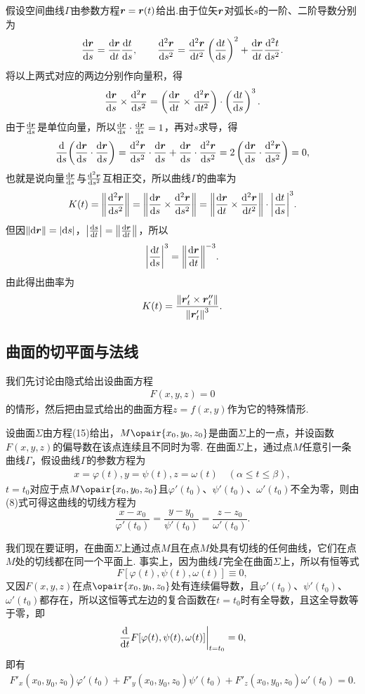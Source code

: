 假设空间曲线\(\Gamma\)由参数方程\(\boldsymbol{r} = \boldsymbol{r}(t)\)给出.由于位矢\(\boldsymbol{r}\)对弧长\(s\)的一阶、二阶导数分别为\[
\dv{\boldsymbol{r}}{s} = \dv{\boldsymbol{r}}{t} \dv{t}{s},
\qquad
\dv[2]{\boldsymbol{r}}{s} = \dv[2]{\boldsymbol{r}}{t} \left(\dv{t}{s}\right)^2 + \dv{\boldsymbol{r}}{t} \dv[2]{t}{s}.
\]将以上两式对应的两边分别作向量积，得\[
\dv{\boldsymbol{r}}{s} \times \dv[2]{\boldsymbol{r}}{s}
= \left(\dv{\boldsymbol{r}}{t} \times \dv[2]{\boldsymbol{r}}{t}\right) \cdot \left(\dv{t}{s}\right)^3.
\]由于\(\dv{\boldsymbol{r}}{s}\)是单位向量，所以\(\dv{\boldsymbol{r}}{s} \cdot \dv{\boldsymbol{r}}{s} = 1\)，再对\(s\)求导，得\[
\dv{s}( \dv{\boldsymbol{r}}{s} \cdot \dv{\boldsymbol{r}}{s} )
= \dv[2]{\boldsymbol{r}}{s} \cdot \dv{\boldsymbol{r}}{s} + \dv{\boldsymbol{r}}{s} \cdot \dv[2]{\boldsymbol{r}}{s}
= 2 \left( \dv{\boldsymbol{r}}{s} \cdot \dv[2]{\boldsymbol{r}}{s} \right)
= 0,
\]也就是说向量\(\dv{\boldsymbol{r}}{s}\)与\(\dv[2]{\boldsymbol{r}}{s}\)互相正交，所以曲线\(\Gamma\)的曲率为\[
K(t) = \norm{ \dv[2]{\boldsymbol{r}}{s} }
= \norm{ \dv{\boldsymbol{r}}{s} \times \dv[2]{\boldsymbol{r}}{s} }
= \norm{ \dv{\boldsymbol{r}}{t} \times \dv[2]{\boldsymbol{r}}{t} } \cdot \abs{ \dv{t}{s} }^3.
\]但因\(\norm{ \dd{\boldsymbol{r}} } = \abs{ \dd{s} }\)，\(\abs{ \dv{s}{t} } = \norm{ \dv{\boldsymbol{r}}{t} }\)，所以\[
\abs{ \dv{t}{s} }^3 = \norm{ \dv{\boldsymbol{r}}{t} }^{-3}.
\]由此得出曲率为\begin{equation}
K(t) = \frac{ \norm{ \boldsymbol{r}'_t \times \boldsymbol{r}''_t } }{ \norm{ \boldsymbol{r}'_t }^3 }.
\end{equation}

\subsection{曲面的切平面与法线}
我们先讨论由隐式给出设曲面方程\begin{gather}
F(x,y,z)=0
\tag{15}
\end{gather}的情形，然后把由显式给出的曲面方程\(z = f(x,y)\)作为它的特殊情形.

设曲面\(\Sigma\)由方程(15)给出，\(M\opair{x_0,y_0,z_0}\)是曲面\(\Sigma\)上的一点，并设函数\(F(x,y,z)\)的偏导数在该点连续且不同时为零.
在曲面\(\Sigma\)上，通过点\(M\)任意引一条曲线\(\Gamma\)，假设曲线\(\Gamma\)的参数方程为\begin{gather}
x = \varphi(t),
y = \psi(t),
z = \omega(t)
\quad (\alpha \leqslant t \leqslant \beta),
\tag{16}
\end{gather}
\(t = t_0\)对应于点\(M\opair{x_0,y_0,z_0}\)且\(\varphi'(t_0)\)、\(\psi'(t_0)\)、\(\omega'(t_0)\)不全为零，则由(8)式可得这曲线的切线方程为\[
\frac{x-x_0}{\varphi'(t_0)}
=\frac{y-y_0}{\psi'(t_0)}
=\frac{z-z_0}{\omega'(t_0)}.
\]

我们现在要证明，在曲面\(\Sigma\)上通过点\(M\)且在点\(M\)处具有切线的任何曲线，它们在点\(M\)处的切线都在同一个平面上.
事实上，因为曲线\(\Gamma\)完全在曲面\(\Sigma\)上，所以有恒等式\[
F[\varphi(t),\psi(t),\omega(t)] \equiv 0,
\]又因\(F(x,y,z)\)在点\(\opair{x_0,y_0,z_0}\)处有连续偏导数，且\(\varphi'(t_0)\)、\(\psi'(t_0)\)、\(\omega'(t_0)\)都存在，所以这恒等式左边的复合函数在\(t = t_0\)时有全导数，且这全导数等于零，即\[
\eval{\dv{t} F[\varphi(t),\psi(t),\omega(t)]}_{t=t_0} = 0,
\]即有\begin{gather}
F'_x(x_0,y_0,z_0) \varphi'(t_0)
+ F'_y(x_0,y_0,z_0) \psi'(t_0)
+ F'_z(x_0,y_0,z_0) \omega'(t_0)
= 0.
\tag{17}
\end{gather}

